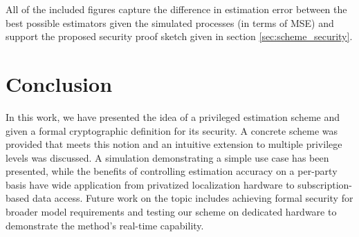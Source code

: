 \documentclass[letterpaper, 10 pt, conference]{ieeeconf}
\begin{document}
All of the included figures capture the difference in estimation error between the best possible estimators given the simulated processes (in terms of MSE) and support the proposed security proof sketch given in section \ref{sec:scheme_security}.

% 
%                                               
%                                               
%                                               
% 

\section{Conclusion}\label{sec:conclusion}
In this work, we have presented the idea of a privileged estimation scheme and given a formal cryptographic definition for its security. A concrete scheme was provided that meets this notion and an intuitive extension to multiple privilege levels was discussed. A simulation demonstrating a simple use case has been presented, while the benefits of controlling estimation accuracy on a per-party basis have wide application from privatized localization hardware to subscription-based data access. Future work on the topic includes achieving formal security for broader model requirements and testing our scheme on dedicated hardware to demonstrate the method's real-time capability. 













\end{document}
